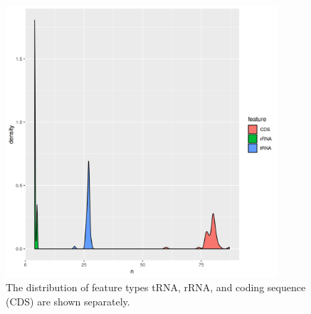 \documentclass{bmcart}
\begin{document}
\begin{backmatter}
\begin{figure}[h!]
  \centering
  \includegraphics[width=0.9\textwidth]{feature_counts_distinct.png}
  \caption{ The distribution of feature types tRNA, rRNA, and coding sequence (CDS) are shown separately.%
      }
      \label{fig:feature_count_novel}
      \end{figure}



\end{backmatter}
\end{document}
